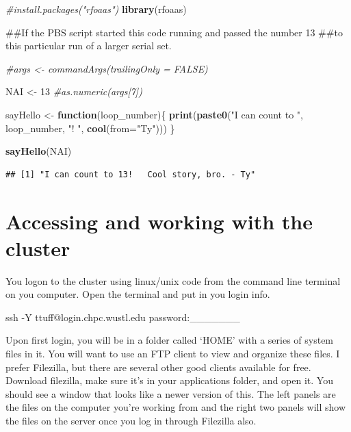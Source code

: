 \documentclass[]{book}
\newenvironment{Shaded}{\begin{snugshade}}{\end{snugshade}}
\newcommand{\KeywordTok}[1]{\textcolor[rgb]{0.13,0.29,0.53}{\textbf{{#1}}}}
\newcommand{\DataTypeTok}[1]{\textcolor[rgb]{0.13,0.29,0.53}{{#1}}}
\newcommand{\DecValTok}[1]{\textcolor[rgb]{0.00,0.00,0.81}{{#1}}}
\newcommand{\StringTok}[1]{\textcolor[rgb]{0.31,0.60,0.02}{{#1}}}
\newcommand{\CommentTok}[1]{\textcolor[rgb]{0.56,0.35,0.01}{\textit{{#1}}}}
\newcommand{\FunctionTok}[1]{\textcolor[rgb]{0.00,0.00,0.00}{{#1}}}
\newcommand{\ControlFlowTok}[1]{\textcolor[rgb]{0.13,0.29,0.53}{\textbf{{#1}}}}
\newcommand{\ExtensionTok}[1]{{#1}}
\newcommand{\NormalTok}[1]{{#1}}
\theoremstyle{definition}
\theoremstyle{definition}
\theoremstyle{remark}
\begin{document}
\begin{Shaded}
\begin{Highlighting}[]
\CommentTok{#install.packages("rfoaas")}
\KeywordTok{library}\NormalTok{(rfoaas)}

\NormalTok{##If the PBS script started this code running and passed the number 13}
\NormalTok{##to this particular run of a larger serial set. }


\CommentTok{#args <- commandArgs(trailingOnly = FALSE) }

\NormalTok{NAI <-}\StringTok{ }\DecValTok{13} \CommentTok{#as.numeric(args[7])}

\NormalTok{    sayHello <-}\StringTok{ }\ControlFlowTok{function}\NormalTok{(loop_number)\{}
      \KeywordTok{print}\NormalTok{(}\KeywordTok{paste0}\NormalTok{(}\StringTok{"I can count to "}\NormalTok{, loop_number, }\StringTok{"!   "}\NormalTok{, }\KeywordTok{cool}\NormalTok{(}\DataTypeTok{from=}\StringTok{"Ty"}\NormalTok{)))}
\NormalTok{    \}}

    \KeywordTok{sayHello}\NormalTok{(NAI)}
\end{Highlighting}
\end{Shaded}

\begin{verbatim}
## [1] "I can count to 13!   Cool story, bro. - Ty"
\end{verbatim}

\section{Accessing and working with the
cluster}\label{accessing-and-working-with-the-cluster}

You logon to the cluster using linux/unix code from the command line
terminal on you computer. Open the terminal and put in you login info.

\begin{Shaded}
\begin{Highlighting}[]
\FunctionTok{ssh}\NormalTok{ -Y ttuff@login.chpc.wustl.edu}
\ExtensionTok{password}\NormalTok{:_______}
\end{Highlighting}
\end{Shaded}

Upon first login, you will be in a folder called `HOME' with a series of
system files in it. You will want to use an FTP client to view and
organize these files. I prefer Filezilla, but there are several other
good clients available for free. Download filezilla, make sure it's in
your applications folder, and open it. You should see a window that
looks like a newer version of this. The left panels are the files on the
computer you're working from and the right two panels will show the
files on the server once you log in through Filezilla also.
\end{document}
